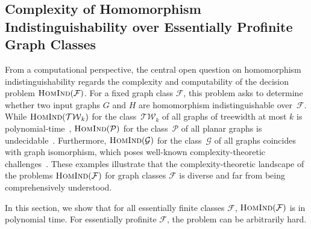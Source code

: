\documentclass[3p,final]{elsarticle}
\newcommand{\HomInd}{\textup{\textsc{HomInd}}}
\begin{document}
	\subsection{Complexity of Homomorphism Indistinguishability over Essentially Profinite Graph Classes}
	
	From a computational perspective, the central open question on homomorphism indistinguishability regards the complexity and computability of the decision problem  $\HomInd(\mathcal{F})$. 
	For a fixed graph class $\mathcal{F}$, this problem asks to determine whether two input graphs $G$ and $H$ are  homomorphism indistinguishable over~$\mathcal{F}$.
	While $\HomInd(\mathcal{TW}_k)$ for the class~$\mathcal{TW}_k$ of all graphs of treewidth at most $k$ is polynomial-time~\cite{dvorak_recognizing_2010,cai_optimal_1992}, 
	$\HomInd(\mathcal{P})$ for the class~$\mathcal{P}$ of all planar graphs is undecidable~\cite{mancinska_quantum_2019}.
	Furthermore, $\HomInd(\mathcal{G})$ for the class~$\mathcal{G}$ of all graphs coincides with graph isomorphism, which poses well-known complexity-theoretic challenges~\cite{babai_graph_2016}.
	These examples illustrate that the complexity-theoretic landscape of the problems  $\HomInd(\mathcal{F})$ for graph classes $\mathcal{F}$ is diverse and far from being comprehensively understood.
	
	In this section, we show that for all essentially finite classes $\mathcal{F}$, $\HomInd(\mathcal{F})$ is in polynomial time. 
	For essentially profinite $\mathcal{F}$, the problem can be arbitrarily hard.
	
\end{document}
